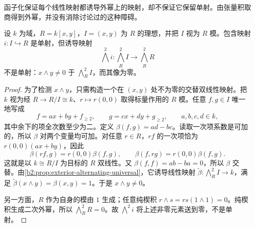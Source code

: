 \ProseParagraphBreak
函子化保证每个线性映射都诱导外幂上的映射，却不保证它保留单射。由张量积取商得到外幂，并没有消除讨论过的这种障碍。

\begin{proposition}\label{b2:prop:exterior-injection-failure}
	设 \(k\) 为域，\(R=k[x,y]\)，\(I=(x,y)\) 为 \(R\) 的理想，并把 \(I\) 视为 \(R\) 模。包含映射 \(i:I\hookrightarrow R\) 是单射，但诱导映射
	\[
		\bigwedge^2i:\bigwedge^2_R I\longrightarrow\bigwedge^2_R R
	\]
	不是单射：\(x\wedge y\ne0\) 于 \(\bigwedge^2_R I\)，而其像为零。
\end{proposition}
\begin{proof}
	为了检测 \(x\wedge y\)，只需构造一个在 \((x,y)\) 处不为零的交替双线性映射。把 \(k\) 视为经 \(R\rightarrow R/I\cong k\)、\(r\mapsto r(0,0)\) 取得标量作用的 \(R\) 模。任意 \(f,g\in I\) 唯一地写成
	\[
		f=ax+by+f_{\ge2},\qquad g=cx+dy+g_{\ge2}, \qquad a,b,c,d\in k,
	\]
	其中余下的项全次数至少为二。定义 \(\beta(f,g)=ad-bc\)。读取一次项系数是可加的，所以 \(\beta\) 对两个变量均可加。对任意 \(r\in R\)，\(rf\) 的一次项恰为 \(r(0,0)(ax+by)\)，因此
	\[
		\beta(rf,g)=r(0,0)\beta(f,g), \qquad \beta(f,rg)=r(0,0)\beta(f,g).
	\]
	这就是以 \(k\cong R/I\) 为目标的 \(R\) 双线性。又 \(\beta(f,f)=ab-ba=0\)，所以 \(\beta\) 交替。由\cref{b2:prop:exterior-alternating-universal}，它诱导线性映射 \(\widetilde\beta:\bigwedge^2_RI\rightarrow k\)，满足 \(\widetilde\beta(x\wedge y)=\beta(x,y)=1\)。于是 \(x\wedge y\ne0\)。

	另一方面，\(R\) 作为自身的模由 \(1\) 生成；任意纯楔积 \(r\wedge s=rs(1\wedge1)=0\)。纯楔积生成二次外幂，所以 \(\bigwedge^2_R R=0\)。故 \(\bigwedge^2i\) 将上述非零元素送到零，不是单射。
\end{proof}
